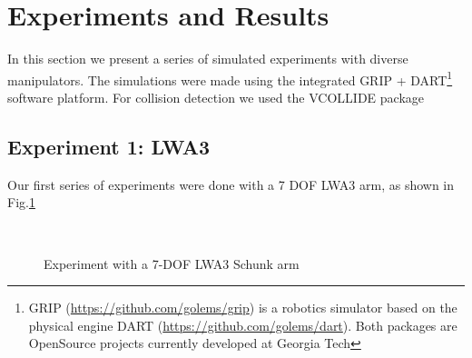 \documentclass[conference]{IEEEtran}
\begin{document}
\section{Experiments and Results}
\label{sec:Experiments}
In this section we present a series of simulated experiments
with diverse manipulators. The simulations were made using the
integrated GRIP + DART\footnote{ GRIP (\url{https://github.com/golems/grip})
is a robotics simulator based on the physical engine DART (\url{https://github.com/golems/dart}).
Both packages are OpenSource projects currently developed at Georgia Tech} 
software platform. For collision detection we used the VCOLLIDE\cite{Hudson97v-collide:accelerated}
package

\subsection{Experiment 1: LWA3}
Our first series of experiments were done with a 7 DOF LWA3 arm, as shown in Fig.\ref{fig:Experiment1_LWA3} 
\begin{figure}[]
  \centering
   \\
  \caption{ Experiment with a 7-DOF LWA3 Schunk arm}
  \label{fig:Experiment1_LWA3}
\end{figure}
\end{document}
